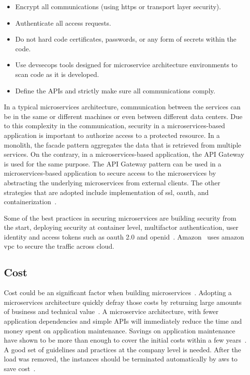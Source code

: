 \begin{itemize}
\item Encrypt all communications (using https or transport layer security).
\item Authenticate all access requests.
\item Do not hard code certificates, passwords, or any form of secrets within the code.
\item Use devsecops tools designed for microservice architecture environments to scan code as it is developed.
\item Define the APIs and strictly make sure all communications comply.

\end{itemize}

In a typical microservices architecture, communication between the services can be in the same or different machines or even between different data centers. Due to this complexity in the communication, security in a microservices-based application is important to authorize access to a protected resource.
In a monolith, the facade pattern aggregates the data that is retrieved from multiple services. On the contrary, in a microservices-based application, the API Gateway is used for the same purpose. The API Gateway pattern can be used in a microservices-based application to secure access to the microservices by abstracting the underlying microservices from external clients. The other strategies that are adopted include implementation of ssl, oauth, and containerization~\cite{Zaytev2018, tenev2019, Monterio2018}. 

\par Some of the best practices in securing microservices are building security from the start, deploying security at container level, multifactor authentication, user identity and access tokens such as oauth 2.0 and openid~\cite{Gonchar2017}. Amazon~\cite{Amazon} uses amazon vpc to secure the traffic across cloud.


\subsection{Cost}%
Cost could be an significant factor when building microservices~\cite{Koschel2017, Netflix, Michael2018}. 
%
Adopting a microservices architecture quickly defray those costs by returning large amounts of business and technical value~\cite{McElhiney2018, Leo2019}. A microservice architecture, with fewer application dependencies and simple APIs will immediately reduce the time and money spent on application maintenance. Savings on application maintenance have shown to be more than enough to cover the initial costs within a few years~\cite{Otharson2019}. 
A good set of guidelines and practices at the company level is needed. After the load was removed, the instances should be terminated automatically by aws to save cost~\cite{McElhiney2018}. 

